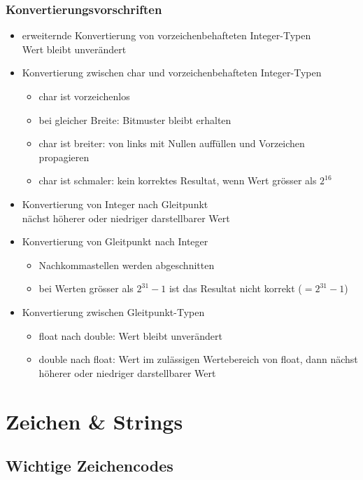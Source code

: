 \documentclass[a4paper,10pt]{article}
\begin{document}
\subsubsection{Konvertierungsvorschriften}
\begin{itemize}
	\item erweiternde Konvertierung von vorzeichenbehafteten Integer-Typen \\
		Wert bleibt unver\"andert
	\item Konvertierung zwischen char und vorzeichenbehafteten Integer-Typen
		\begin{itemize}
			\item char ist vorzeichenlos
			\item bei gleicher Breite: Bitmuster bleibt erhalten
			\item char ist breiter: von links mit Nullen auff\"ullen und Vorzeichen propagieren
			\item char ist schmaler: kein korrektes Resultat, wenn Wert gr\"osser als $2^{16}$
		\end{itemize}
	\item Konvertierung von Integer nach Gleitpunkt \\
		n\"achst h\"oherer oder niedriger darstellbarer Wert
	\item Konvertierung von Gleitpunkt nach Integer
		\begin{itemize}
			\item Nachkommastellen werden abgeschnitten
			\item bei Werten gr\"osser als $2^{31} - 1$ ist das Resultat nicht korrekt ($= 2^{31} - 1$)
		\end{itemize}
	\item Konvertierung zwischen Gleitpunkt-Typen
		\begin{itemize}
			\item float nach double: Wert bleibt unver\"andert
			\item double nach float: Wert im zul\"assigen Wertebereich von float, dann n\"achst h\"oherer oder niedriger darstellbarer Wert
		\end{itemize}
\end{itemize}

\newpage
\section{Zeichen \& Strings}
\subsection{Wichtige Zeichencodes}
\end{document}
